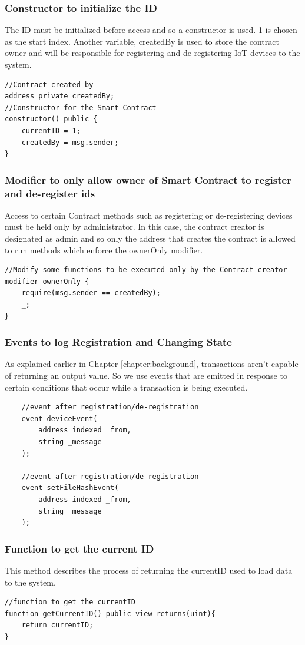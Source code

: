 \documentclass[11pt,openright]{report}
\begin{document}
\subsubsection{Constructor to initialize the ID}
The ID must be initialized before access and so a constructor is used. 1  is chosen as the start index. Another variable, createdBy is used to store the contract owner and will be responsible for registering and de-registering IoT devices to the system.
\begin{lstlisting}
//Contract created by
address private createdBy;
//Constructor for the Smart Contract
constructor() public {
    currentID = 1;
    createdBy = msg.sender;
}
\end{lstlisting}

\subsubsection{Modifier to only allow owner of Smart Contract to register and de-register ids}
Access to certain Contract methods such as registering or de-registering devices must be held only by administrator. In this case, the contract creator is designated as admin and so only the address that creates the contract is allowed to run methods which enforce the ownerOnly modifier.
\begin{lstlisting}
//Modify some functions to be executed only by the Contract creator
modifier ownerOnly {
    require(msg.sender == createdBy);
    _;
}
\end{lstlisting}

\subsubsection{Events to log Registration and Changing State}
As explained earlier in Chapter \ref{chapter:background}, transactions aren't capable of returning an output value. So we use events that are emitted in response to certain conditions that occur while a transaction is being executed.

\begin{lstlisting}
    //event after registration/de-registration
    event deviceEvent(
        address indexed _from,
        string _message
    );
    
    //event after registration/de-registration
    event setFileHashEvent(
        address indexed _from,
        string _message
    );
\end{lstlisting}

\subsubsection{Function to get the current ID}
This method describes the process of returning the currentID used to load data to the system.
\begin{lstlisting}
//function to get the currentID
function getCurrentID() public view returns(uint){
    return currentID;
}
\end{lstlisting}
\end{document}
